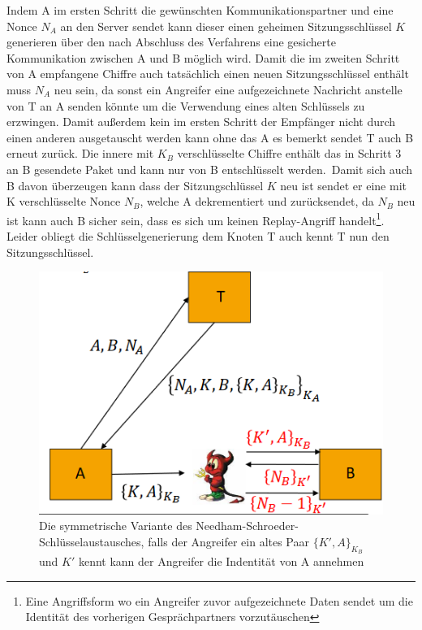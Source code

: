 \documentclass[a4paper,12pt,leqno]{article}
\begin{document}
Indem A im ersten Schritt die gewünschten Kommunikationspartner und eine Nonce $N_A$ an den Server sendet kann dieser einen geheimen Sitzungsschlüssel $K$ generieren über den nach Abschluss des Verfahrens eine gesicherte Kommunikation zwischen A und B möglich wird. Damit die im zweiten Schritt von A empfangene Chiffre auch tatsächlich einen neuen Sitzungsschlüssel enthält muss $N_A$ neu sein, da sonst ein Angreifer eine aufgezeichnete Nachricht anstelle von T an A senden könnte um die Verwendung eines alten Schlüssels zu erzwingen. Damit außerdem kein im ersten Schritt der Empfänger nicht durch einen anderen ausgetauscht werden kann ohne das A es bemerkt sendet T auch B erneut zurück. Die innere mit $K_B$ verschlüsselte Chiffre enthält das in Schritt 3 an B gesendete Paket und kann nur von B entschlüsselt werden.\
Damit sich auch B davon überzeugen kann dass der Sitzungschlüssel $K$ neu ist sendet er eine mit K verschlüsselte Nonce $N_B$, welche A dekrementiert und zurücksendet, da $N_B$ neu ist kann auch B sicher sein, dass es sich um keinen Replay-Angriff handelt\footnote{Eine Angriffsform wo ein Angreifer zuvor aufgezeichnete Daten sendet um die Identität des vorherigen Gesprächpartners vorzutäuschen}.\\
Leider obliegt die Schlüsselgenerierung dem Knoten T auch kennt T nun den Sitzungsschlüssel.

\begin{figure}
\centering
\includegraphics[scale=0.6]{Grafiken/NeedhamSchroederSymmetrisch.png}
\caption{Die symmetrische Variante des Needham-Schroeder-Schlüsselaustausches, falls der Angreifer ein altes Paar $\{K',A\}_{K_B}$ und $K'$ kennt kann der Angreifer die Indentität von A annehmen}
\end{figure}
\end{document}
